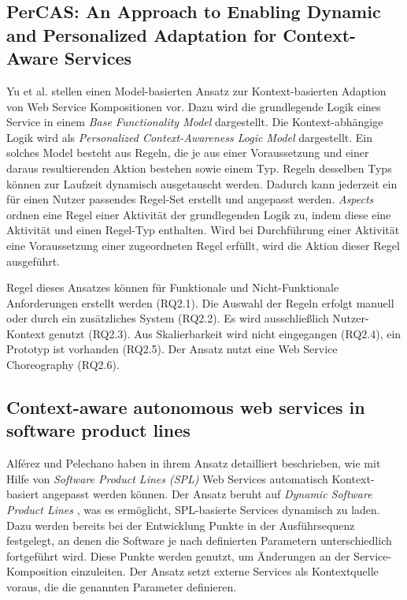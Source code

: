 \documentclass[conference,compsoc]{IEEEtran}
\begin{document}
\subsection{PerCAS: An Approach to Enabling Dynamic and Personalized Adaptation for Context-Aware Services}
Yu et al. \cite{YHS12} stellen einen Model-basierten Ansatz zur Kontext-basierten Adaption von Web Service Kompositionen vor. Dazu wird die grundlegende Logik eines Service in einem \textit{Base Functionality Model} dargestellt. Die Kontext-abhängige Logik wird als \textit{Personalized Context-Awareness Logic Model} dargestellt. Ein solches Model besteht aus Regeln, die je aus einer Voraussetzung und einer daraus resultierenden Aktion bestehen sowie einem Typ. Regeln desselben Typs können zur Laufzeit dynamisch ausgetauscht werden. Dadurch kann jederzeit ein für einen Nutzer passendes Regel-Set erstellt und angepasst werden. \textit{Aspects} ordnen eine Regel einer Aktivität der grundlegenden Logik zu, indem diese eine Aktivität und einen Regel-Typ enthalten. Wird bei Durchführung einer Aktivität eine Voraussetzung einer zugeordneten Regel erfüllt, wird die Aktion dieser Regel ausgeführt.

Regel dieses Ansatzes können für Funktionale und Nicht-Funktionale Anforderungen erstellt werden (RQ2.1). Die Auswahl der Regeln erfolgt manuell oder durch ein zusätzliches System (RQ2.2). Es wird ausschließlich Nutzer-Kontext genutzt (RQ2.3). Aus Skalierbarkeit wird nicht eingegangen (RQ2.4), ein Prototyp ist vorhanden (RQ2.5). Der Ansatz nutzt eine Web Service Choreography (RQ2.6).

\subsection{Context-aware autonomous web services in software product lines}
Alférez und Pelechano \cite{AP11} haben in ihrem Ansatz detailliert beschrieben, wie mit Hilfe von \textit{Software Product Lines (SPL)} Web Services automatisch Kontext-basiert angepasst werden können. Der Ansatz beruht auf \textit{Dynamic Software Product Lines} \cite{HHP08}, was es ermöglicht, SPL-basierte Services dynamisch zu laden. Dazu werden bereits bei der Entwicklung Punkte in der Ausführsequenz festgelegt, an denen die Software je nach definierten Parametern unterschiedlich fortgeführt wird. Diese Punkte werden genutzt, um Änderungen an der Service-Komposition einzuleiten. Der Ansatz setzt externe Services als Kontextquelle voraus, die die genannten Parameter definieren.
\end{document}
